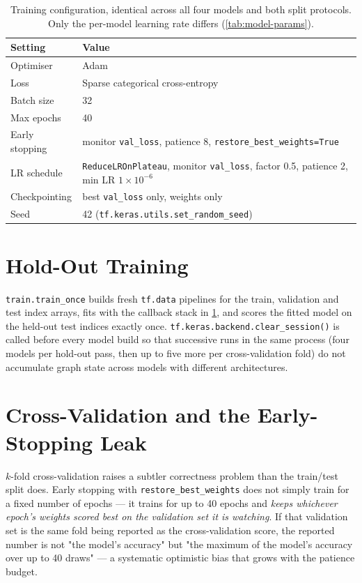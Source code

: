 \documentclass[11pt,a4paper,oneside]{report}
\newcommand{\code}[1]{\texttt{\small #1}}
\begin{document}
\begin{table}[h]
\centering
\small
\begin{tabular}{@{}ll@{}}
\toprule
\textbf{Setting} & \textbf{Value} \\
\midrule
Optimiser & Adam \\
Loss & Sparse categorical cross-entropy \\
Batch size & 32 \\
Max epochs & 40 \\
Early stopping & monitor \code{val\_loss}, patience 8, \code{restore\_best\_weights=True} \\
LR schedule & \code{ReduceLROnPlateau}, monitor \code{val\_loss}, factor 0.5, patience 2, min LR $1\times10^{-6}$ \\
Checkpointing & best \code{val\_loss} only, weights only \\
Seed & 42 (\code{tf.keras.utils.set\_random\_seed}) \\
\bottomrule
\end{tabular}
\caption{Training configuration, identical across all four models and both
split protocols. Only the per-model learning rate differs
(\cref{tab:model-params}).}
\label{tab:train-config}
\end{table}

\section{Hold-Out Training}

\code{train.train\_once} builds fresh \code{tf.data} pipelines for the
train, validation and test index arrays, fits with the callback stack in
\cref{tab:train-config}, and scores the fitted model on the held-out test
indices exactly once. \code{tf.keras.backend.clear\_session()} is called
before every model build so that successive runs in the same process (four
models per hold-out pass, then up to five more per cross-validation fold) do
not accumulate graph state across models with different architectures.

\section{Cross-Validation and the Early-Stopping Leak}
\label{sec:carve-validation}

$k$-fold cross-validation raises a subtler correctness problem than the
train/test split does. Early stopping with \code{restore\_best\_weights}
does not simply train for a fixed number of epochs --- it trains for up to
40 epochs and \emph{keeps whichever epoch's weights scored best on the
validation set it is watching}. If that validation set is the same fold
being reported as the cross-validation score, the reported number is not
"the model's accuracy" but "the maximum of the model's accuracy over up to
40 draws" --- a systematic optimistic bias that grows with the patience
budget.
\end{document}

